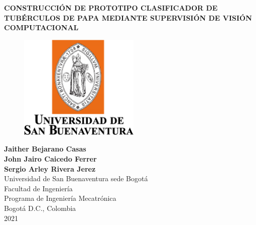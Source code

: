 \cleardoublepage

\thispagestyle{empty} 
\begin{center}
\textbf{ 
\huge{CONSTRUCCIÓN DE PROTOTIPO CLASIFICADOR DE TUBÉRCULOS DE PAPA MEDIANTE SUPERVISIÓN DE VISIÓN COMPUTACIONAL}}\\[1.0cm]


\begin{figure}[htbp]
	\centering
		\includegraphics[height=5cm,keepaspectratio]{OtrosTex/LogoUSB}
\end{figure}

\vspace*{2cm} 
\Large\textbf{Jaither Bejarano Casas \\ John Jairo Caicedo Ferrer \\Sergio Arley Rivera Jerez}\\[1.0cm]

\vspace*{2cm} 
\Large{Universidad de San Buenaventura sede Bogotá}\\
\Large{Facultad de Ingeniería}\\
\Large{Programa de Ingeniería Mecatrónica}\\
\large{Bogotá D.C., Colombia\\
2021}\\
\end{center}

\newpage{\pagestyle{empty}\cleardoublepage}
\newpage
%
